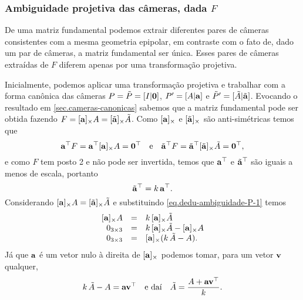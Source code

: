\subsubsection{Ambiguidade projetiva das câmeras, dada $F$}\label{sec.ambi-cameras-dada-F}

De uma matriz fundamental podemos extrair diferentes pares de câmeras consistentes com a mesma geometria epipolar, em contraste com o fato de, dado um par de câmeras, a matriz fundamental ser única. Esses pares de câmeras extraídas de $F$ diferem apenas por uma transformação projetiva.

Inicialmente, podemos aplicar uma transformação projetiva e trabalhar com a forma canônica das câmeras $P=\tilde{P}=[I|{\bf 0}]$, $P'=[A|{\bf a}]$ e $\tilde{P}'=[\tilde{A}|\tilde{{\bf a}}]$. Evocando o resultado em \ref{sec.cameras-canonicas} sabemos que a matriz fundamental pode ser obtida fazendo 
$F=[{\bf a}]_{\times} A=[\tilde{{\bf a}}]_{\times} \tilde{A}$. Como $[{\bf a}]_{\times}$ e $[\tilde{{\bf a}}]_{\times}$ são anti-simétricas temos que
\begin{equation*}
{\bf a}^\top F={\bf a}^\top [{\bf a}]_{\times} A={\bf 0}^\top\quad\text{e}\quad\tilde{{\bf a}}^\top F=\tilde{{\bf a}}^\top [\tilde{{\bf a}}]_{\times} \tilde{A}={\bf 0}^\top,
\end{equation*}
e como $F$ tem posto 2 e não pode ser invertida, temos que ${\bf a}^\top$ e ${\tilde{{\bf a}}^\top}$ são iguais a menos de escala, portanto
\begin{equation}\label{eq.dedu-ambiguidade-P-1}
{\tilde{{\bf a}}^\top}=k\,{\bf a}^\top.
\end{equation}
Considerando $[{\bf a}]_{\times} A=[\tilde{{\bf a}}]_{\times} \tilde{A}$ e substituindo \ref{eq.dedu-ambiguidade-P-1} temos
\begin{equation*}
\begin{array}{rcl}
[{\bf a}]_{\times} A&=&k\,[{\bf a}]_{\times} \tilde{A}\\
0_{3\times3}&=&k\,[{\bf a}]_{\times} \tilde{A}-[{\bf a}]_{\times} A\\
0_{3\times3}&=&[{\bf a}]_{\times}(k\,\tilde{A}-A).
\end{array}
\end{equation*}
Já que ${\bf a}$ é um vetor nulo à direita de $[{\bf a}]_{\times}$ podemos tomar, para um vetor ${\bf v}$ qualquer,
\begin{equation}\label{eq.dedu-ambiguidade-P-2}
k\,\tilde{A}-A={\bf a}{\bf v}^\top\quad\text{e daí}\quad \tilde{A}=\frac{A+{\bf a}{\bf v}^\top}{k}. 
\end{equation}
